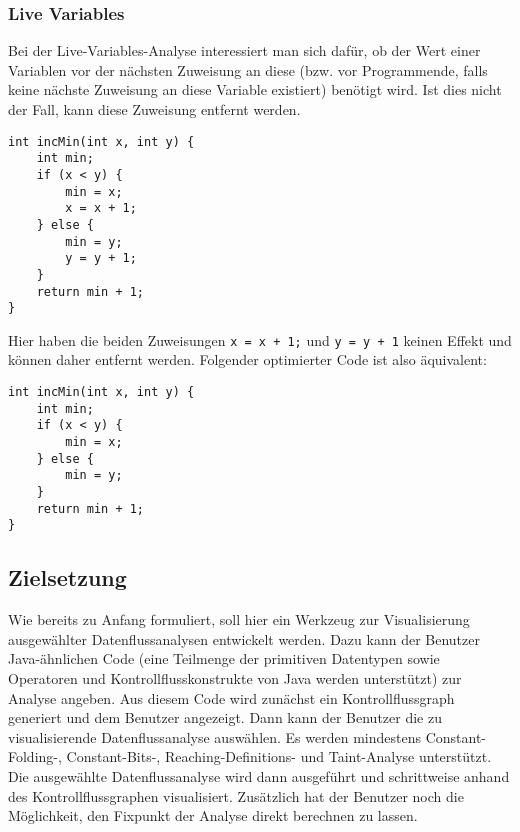 \subsubsection{Live Variables}
Bei der Live-Variables-Analyse interessiert man sich dafür, ob der Wert einer Variablen vor der nächsten Zuweisung an diese (bzw. vor Programmende, falls keine nächste Zuweisung an diese Variable existiert) benötigt wird. 
Ist dies nicht der Fall, kann diese Zuweisung entfernt werden.

\par

\begin{lstlisting}[frame=single, captionpos=b, caption=Beispielcode für Live-Variables-Analyse]
int incMin(int x, int y) {
	int min;
	if (x < y) {
		min = x;
		x = x + 1;
	} else {
		min = y;
		y = y + 1;
	}
	return min + 1;
}
\end{lstlisting}

\par

Hier haben die beiden Zuweisungen \lstinline{x = x + 1;} und \lstinline{y = y + 1} keinen Effekt und können daher entfernt werden.
Folgender optimierter Code ist also äquivalent:

\par

\begin{lstlisting}[frame=single, captionpos=b, caption=Mittels Live-Variables-Analyse optimierte Version von Listing 7]
int incMin(int x, int y) {
	int min;
	if (x < y) {
		min = x;
	} else {
		min = y;
	}
	return min + 1;
}
\end{lstlisting}

\subsection{Zielsetzung}
Wie bereits zu Anfang formuliert, soll hier ein Werkzeug zur Visualisierung ausgewählter Datenflussanalysen entwickelt werden.
Dazu kann der Benutzer Java-ähnlichen Code (eine Teilmenge der primitiven Datentypen sowie Operatoren und Kontrollflusskonstrukte von Java werden unterstützt) zur Analyse angeben.
Aus diesem Code wird zunächst ein Kontrollflussgraph generiert und dem Benutzer angezeigt.
Dann kann der Benutzer die zu visualisierende Datenflussanalyse auswählen.
Es werden mindestens Constant-Folding-, Constant-Bits-, Reaching-Definitions- und Taint-Analyse unterstützt.
Die ausgewählte Datenflussanalyse wird dann ausgeführt und schrittweise anhand des Kontrollflussgraphen visualisiert.
Zusätzlich hat der Benutzer noch die Möglichkeit, den Fixpunkt der Analyse direkt berechnen zu lassen.

